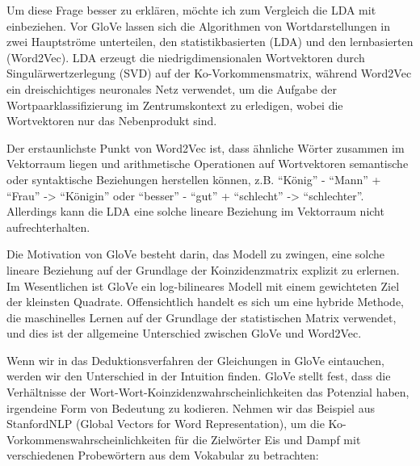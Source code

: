 \documentclass[11pt]{article}
\makeatletter
\newcommand{\boxspacing}{\kern\kvtcb@left@rule\kern\kvtcb@boxsep}
\newcommand{\prompt}[4]{
        \ttfamily\llap{{\color{#2}[#3]:\hspace{3pt}#4}}\vspace{-\baselineskip}
    }
\makeatother
\begin{document}
    \begin{tcolorbox}[breakable, size=fbox, boxrule=1pt, pad at break*=1mm,colback=cellbackground, colframe=cellborder]
\prompt{In}{incolor}{ }{\boxspacing}
\begin{Verbatim}[commandchars=\\\{\}]

\end{Verbatim}
\end{tcolorbox}

    Um diese Frage besser zu erklären, möchte ich zum Vergleich die LDA mit
einbeziehen. Vor GloVe lassen sich die Algorithmen von Wortdarstellungen
in zwei Hauptströme unterteilen, den statistikbasierten (LDA) und den
lernbasierten (Word2Vec). LDA erzeugt die niedrigdimensionalen
Wortvektoren durch Singulärwertzerlegung (SVD) auf der
Ko-Vorkommensmatrix, während Word2Vec ein dreischichtiges neuronales
Netz verwendet, um die Aufgabe der Wortpaarklassifizierung im
Zentrumskontext zu erledigen, wobei die Wortvektoren nur das
Nebenprodukt sind.

Der erstaunlichste Punkt von Word2Vec ist, dass ähnliche Wörter zusammen
im Vektorraum liegen und arithmetische Operationen auf Wortvektoren
semantische oder syntaktische Beziehungen herstellen können, z.B.
``König'' - ``Mann'' + ``Frau'' -\textgreater{} ``Königin'' oder
``besser'' - ``gut'' + ``schlecht'' -\textgreater{} ``schlechter''.
Allerdings kann die LDA eine solche lineare Beziehung im Vektorraum
nicht aufrechterhalten.

Die Motivation von GloVe besteht darin, das Modell zu zwingen, eine
solche lineare Beziehung auf der Grundlage der Koinzidenzmatrix explizit
zu erlernen. Im Wesentlichen ist GloVe ein log-bilineares Modell mit
einem gewichteten Ziel der kleinsten Quadrate. Offensichtlich handelt es
sich um eine hybride Methode, die maschinelles Lernen auf der Grundlage
der statistischen Matrix verwendet, und dies ist der allgemeine
Unterschied zwischen GloVe und Word2Vec.

Wenn wir in das Deduktionsverfahren der Gleichungen in GloVe eintauchen,
werden wir den Unterschied in der Intuition finden. GloVe stellt fest,
dass die Verhältnisse der Wort-Wort-Koinzidenzwahrscheinlichkeiten das
Potenzial haben, irgendeine Form von Bedeutung zu kodieren. Nehmen wir
das Beispiel aus StanfordNLP (Global Vectors for Word Representation),
um die Ko-Vorkommenswahrscheinlichkeiten für die Zielwörter Eis und
Dampf mit verschiedenen Probewörtern aus dem Vokabular zu betrachten:
\end{document}
